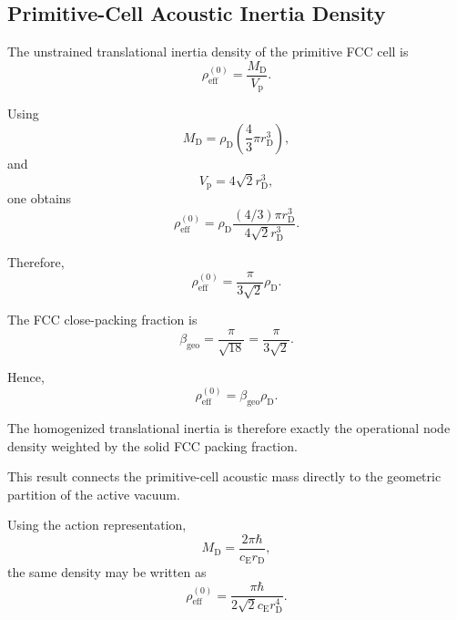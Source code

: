 \subsection{Primitive-Cell Acoustic Inertia Density}

The unstrained translational inertia density of the primitive FCC cell is
\begin{equation}
    \rho_{\mathrm{eff}}^{(0)} = \frac{M_{\mathrm{D}}}{V_{\mathrm{p}}}.
\end{equation}

Using
\begin{equation}
    M_{\mathrm{D}} = \rho_{\mathrm{D}} \left( \frac{4}{3}\pi r_{\mathrm{D}}^3 \right),
\end{equation}
and
\begin{equation}
    V_{\mathrm{p}} = 4\sqrt{2}r_{\mathrm{D}}^3,
\end{equation}
one obtains
\begin{equation}
    \rho_{\mathrm{eff}}^{(0)} = \rho_{\mathrm{D}} \frac{ (4/3)\pi r_{\mathrm{D}}^3 }{ 4\sqrt{2}r_{\mathrm{D}}^3 }.
\end{equation}

Therefore,
\begin{equation}
    \boxed{ \rho_{\mathrm{eff}}^{(0)} = \frac{\pi}{3\sqrt{2}} \rho_{\mathrm{D}} }.
\end{equation}

The FCC close-packing fraction is
\begin{equation}
    \beta_{\mathrm{geo}} = \frac{\pi}{\sqrt{18}} = \frac{\pi}{3\sqrt{2}}.
\end{equation}

Hence,
\begin{equation}
    \boxed{ \rho_{\mathrm{eff}}^{(0)} = \beta_{\mathrm{geo}}\rho_{\mathrm{D}} }.
\end{equation}

The homogenized translational inertia is therefore exactly the operational node density weighted by the solid FCC packing fraction.

This result connects the primitive-cell acoustic mass directly to the geometric partition of the active vacuum.

Using the action representation,
\begin{equation}
    M_{\mathrm{D}} = \frac{2\pi\hbar}{c_{\mathrm{E}}r_{\mathrm{D}}},
\end{equation}
the same density may be written as
\begin{equation}
    \boxed{ \rho_{\mathrm{eff}}^{(0)} = \frac{\pi\hbar}{2\sqrt{2}c_{\mathrm{E}}r_{\mathrm{D}}^4} }.
\end{equation}

